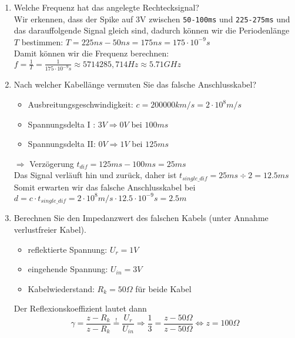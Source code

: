 \documentclass[a4paper]{article}
\begin{document}
\begin{enumerate}[label=\alph*)]
    \item Welche Frequenz hat das angelegte Rechtecksignal?\\
    Wir erkennen, dass der Spike auf 3V zwischen \texttt{50-100ms} und \texttt{225-275ms} und das darauffolgende Signal gleich sind, dadurch können wir die Periodenlänge $T$ bestimmen: $T = 225ns - 50ns = 175ns = 175 \cdot 10^{-9}s$\\
    Damit können wir die Frequenz berechnen: $f = \frac{1}{T} = \frac{1}{175 \cdot 10^{-9}s} \approx 5714285,714Hz \approx 5.71GHz$
    \item Nach welcher Kabellänge vermuten Sie das falsche Anschlusskabel?
    \begin{itemize}
        \item Ausbreitungsgeschwindigkeit: $c = 200000km/s = 2 \cdot 10^{8}m/s$
        \item Spannungsdelta I : $3V \Rightarrow 0V$ bei $100ms$
        \item Spannungsdelta II: $0V \Rightarrow 1V$ bei $125ms$
    \end{itemize}
    $\Rightarrow$ Verzögerung $t_{dif} = 125ms - 100ms = 25ms$\\
    Das Signal verläuft hin und zurück, daher ist $t_{single\_dif} = 25ms \div 2 = 12.5ms$\\
    Somit erwarten wir das falsche Anschlusskabel bei $d = c \cdot t_{single\_dif} = 2 \cdot 10^{8}m/s \cdot 12.5 \cdot 10^{-9}s = 2.5m$
    \item Berechnen Sie den Impedanzwert des falschen Kabels (unter Annahme verlustfreier Kabel).\\
    \begin{itemize}
        \item reflektierte Spannung: $U_r = 1V$
        \item eingehende Spannung: $U_{in} = 3V$
        \item Kabelwiederstand: $R_k = 50\Omega$ für beide Kabel
    \end{itemize}
    Der Reflexionskoeffizient lautet dann \[\gamma = \frac{z - R_k}{z - R_k} \overset{!}{=} \frac{U_r}{U_{in}} \Rightarrow \frac{1}{3} = \frac{z - 50\Omega}{z - 50\Omega} \Leftrightarrow z = 100\Omega\]
\end{enumerate}
\clearpage
\end{document}
